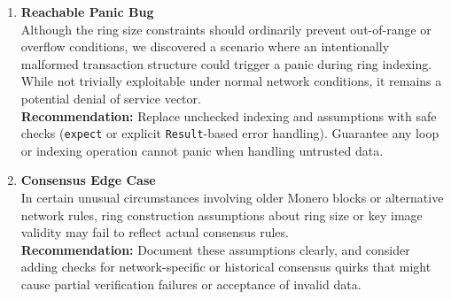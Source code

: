 \documentclass[12pt,a4paper]{article}
\begin{document}
\begin{enumerate}
  \item \textbf{Reachable Panic Bug} \\
  Although the ring size constraints should ordinarily prevent out-of-range or overflow conditions,
  we discovered a scenario where an intentionally malformed transaction structure could trigger a
  panic during ring indexing. While not trivially exploitable under normal network conditions, it
  remains a potential denial of service vector.
  \\
  \textbf{Recommendation:} Replace unchecked indexing and assumptions with safe checks
  (\texttt{expect} or explicit \texttt{Result}-based error handling). Guarantee any loop or
  indexing operation cannot panic when handling untrusted data.

  \item \textbf{Consensus Edge Case} \\
  In certain unusual circumstances involving older Monero blocks or alternative
  network rules, ring construction assumptions about ring size or key image validity
  may fail to reflect actual consensus rules. 
  \\
  \textbf{Recommendation:} Document these assumptions clearly, and consider adding
  checks for network-specific or historical consensus quirks that might cause partial
  verification failures or acceptance of invalid data.
\end{enumerate}



\end{document}
